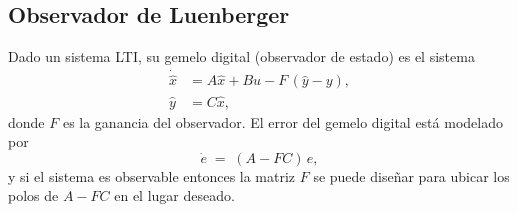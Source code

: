 \documentclass[
  11pt,
  letterpaper,
   addpoints,
  answers
  ]{exam}
\begin{document}
\subsection*{Observador de Luenberger}
Dado un sistema LTI, su gemelo digital (observador de estado) es el sistema
\begin{align}
  \dot{\hat{x}} &= A \hat{x} + B u - F\,(\hat{y}-y),\\
  \hat{y} &= C \hat{x},
\end{align}
donde $F$ es la ganancia del observador. El error del gemelo digital está modelado por
\begin{equation}
  \dot{e} \;=\; (A - FC)\,e,
\end{equation}
y si el sistema es observable entonces la matriz $F$ se puede diseñar para ubicar los polos de $A-FC$ en el lugar deseado.
\end{document}

